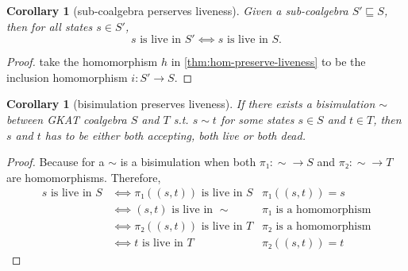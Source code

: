 \documentclass{extarticle}
\newtheorem{corollary}[theorem]{Corollary}
\begin{document}
\begin{corollary}[sub-coalgebra perserves liveness]\label{thm:sub-coalg-preserve-liveness}
    Given a sub-coalgebra \(S' ⊑ S\), then for all states \(s ∈ S'\),
    \[\text{\(s\) is live in \(S'\)} ⟺ \text{\(s\) is live in \(S\)}.\]
\end{corollary}

\begin{proof}
    take the homomorphism \(h\) in \cref{thm:hom-preserve-liveness} to be the inclusion homomorphism \(i: S' → S\).
\end{proof}

\begin{corollary}[bisimulation preserves liveness]\label{thm:bisim-preserve-liveness}
    If there exists a bisimulation \(∼\) between GKAT coalgebra \(S\) and \(T\) s.t. \(s ∼ t\) for some states \(s ∈ S\) and \(t ∈ T\), then \(s\) and \(t\) has to be either both accepting, both live or both dead.
\end{corollary}

\begin{proof}
    Because for a \(∼\) is a bisimulation when both \(π₁: {∼} → S\) and \(π₂: {∼} → T\) are homomorphisms.
    Therefore, 
    \begin{align*}
        s \text{ is live in } S 
        & ⟺ π₁((s, t)) \text{ is live in } S 
            & π₁((s, t)) = s\\  
        & ⟺ (s, t) \text{ is live in } {∼} 
            & \text{\(π₁\) is a homomorphism}\\  
        & ⟺ π₂((s, t)) \text{ is live in } T 
            & \text{\(π₂\) is a homomorphism} \\
        & ⟺ t \text{ is live in } T 
            & π₂((s, t)) = t
    \end{align*}
\end{proof}
\end{document}
